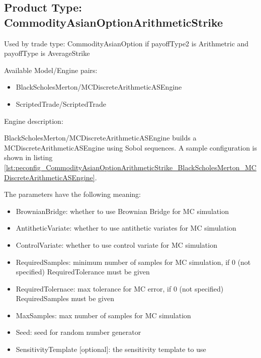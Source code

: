 \subsection{Product Type: CommodityAsianOptionArithmeticStrike}

Used by trade type: CommodityAsianOption if payoffType2 is Arithmetric and payoffType is AverageStrike

Available Model/Engine pairs:

\begin{itemize}
\item BlackScholesMerton/MCDiscreteArithmeticASEngine
\item ScriptedTrade/ScriptedTrade
\end{itemize}
  
Engine description:

BlackScholesMerton/MCDiscreteArithmeticASEngine builds a MCDiscreteArithmeticASEngine using Sobol sequences. A sample
configuration is shown in listing
\ref{lst:peconfig_CommodityAsianOptionArithmeticStrike_BlackScholesMerton_MCDiscreteArithmeticASEngine}.

The parameters have the following meaning:

\begin{itemize}
\item BrownianBridge: whether to use Brownian Bridge for MC simulation
\item AntitheticVariate: whether to use antithetic variates for MC simulation
\item ControlVariate: whether to use control variate for MC simulation
\item RequiredSamples: minimum number of samples for MC simulation, if 0 (not specified) RequiredTolerance must be given
\item RequiredTolernace: max tolerance for MC error, if 0 (not specified) RequiredSamples must be given
\item MaxSamples: max number of samples for MC simulation
\item Seed: seed for random number generator
\item SensitivityTemplate [optional]: the sensitivity template to use 
\end{itemize}

